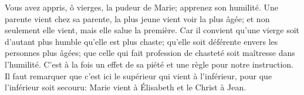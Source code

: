 Vous avez appris, ô vierges, la pudeur de Marie;
	apprenez son humilité.
Une parente vient chez sa parente, la plus jeune vient voir la plus âgée;
	et non seulement elle vient, mais elle salue la première.
Car il convient qu’une vierge soit d’autant plus humble qu’elle est plus chaste;
	qu’elle soit déférente envers les personnes plus âgées;
	que celle qui fait profession de chasteté soit maîtresse dans l’humilité.
C’est à la fois un effet de sa piété
	et une règle pour notre instruction.
Il faut remarquer que c’est ici le supérieur qui vient à l’inférieur,
	pour que l’inférieur soit secouru:
	Marie vient à Élisabeth et le Christ à Jean.
